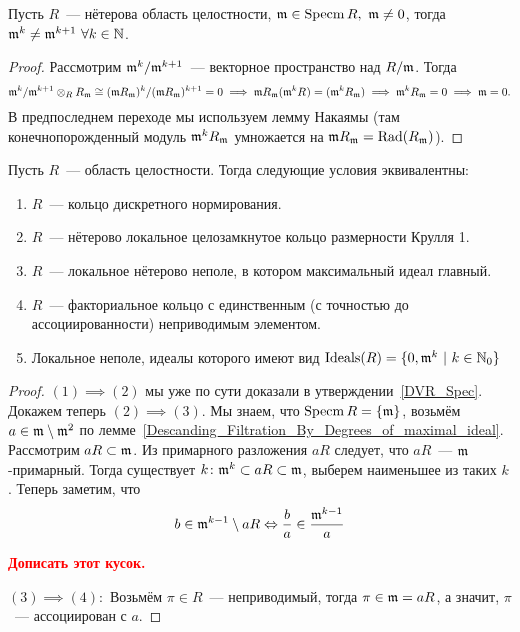 	\begin{lemma}\label{Descanding_Filtration_By_Degrees_of_maximal_ideal} 
		Пусть $R$~--- нётерова область целостности, $\mathfrak{m} \in \operatorname{Specm}{R}, \ \mathfrak{m} \neq 0$, тогда $\mathfrak{m}^k \neq \mathfrak{m}^{k + 1} \ \forall k \in \mathbb{N}$.
	\end{lemma}
	\begin{proof}
		Рассмотрим $\mathfrak{m}^{k}/\mathfrak{m}^{k + 1}$~--- векторное пространство над $R/\mathfrak{m}$. Тогда 
		\[
			\mathfrak{m}^{k}/\mathfrak{m}^{k + 1} \otimes_{R} R_{\mathfrak{m}} \cong (\mathfrak{m} R_{\mathfrak{m}})^{k} / (\mathfrak{m} R_{\mathfrak{m}})^{k + 1} = 0 \implies \mathfrak{m} R_{\mathfrak{m}} (\mathfrak{m}^{k}R_{\rm}) = (\mathfrak{m}^{k}R_{\mathfrak{m}}) \implies \mathfrak{m}^k R_{\mathfrak{m}} = 0 \implies \mathfrak{m} = 0.
		\]
		В предпоследнем переходе мы используем лемму Накаямы (там конечнопорожденный модуль $\mathfrak{m}^{k} R_{\mathfrak{m}}$ умножается на $\mathfrak{m} R_{\mathfrak{m}} = \operatorname{Rad}(R_{\mathfrak{m}})$).
	\end{proof}

	\begin{theorem} 
		Пусть $R$~--- область целостности. Тогда следующие условия эквивалентны: 
		\begin{enumerate}
			\item $R$~--- кольцо дискретного нормирования. 
			\item $R$~--- нётерово локальное целозамкнутое кольцо размерности Крулля 1. 
			\item $R$~--- локальное нётерово неполе, в котором максимальный идеал главный. 
			\item $R$~--- факториальное кольцо с единственным (с точностью до ассоциированности) неприводимым элементом. 
			\item Локальное неполе, идеалы которого имеют вид $\operatorname{Ideals}(R) = \{ 0, \mathfrak{m}^k \ \vert \ k \in \mathbb{N}_{0}\}$
		\end{enumerate}
	\end{theorem}
	\begin{proof}
		$(1) \implies (2)$ мы уже по сути доказали в утверждении~\ref{DVR_Spec}. Докажем теперь $(2) \implies (3)$. Мы знаем, что $\operatorname{Specm}{R} = \{ \mathfrak{m} \}$, возьмём $a \in \mathfrak{m} \setminus \mathfrak{m}^2$  по лемме~\ref{Descanding_Filtration_By_Degrees_of_maximal_ideal}. Рассмотрим $aR \subset \mathfrak{m}$. Из примарного разложения $aR$ следует, что $aR$~--- $\mathfrak{m}$-примарный. Тогда существует $k\colon \mathfrak{m}^{k} \subset aR \subset \mathfrak{m}$, выберем наименьшее из таких $k$. Теперь заметим, что 
		\[
			b \in \mathfrak{m}^{k - 1} \setminus aR \Leftrightarrow \frac{b}{a} \in \frac{\mathfrak{m}^{k - 1}}{a}
		\]

		\bf{\textcolor{red}{Дописать этот кусок.}}

		$(3) \implies (4):$ Возьмём $\pi \in R$~--- неприводимый, тогда $\pi \in \mathfrak{m} = aR$,  а значит, $\pi$~--- ассоциирован с $a$.

	\end{proof}



	
